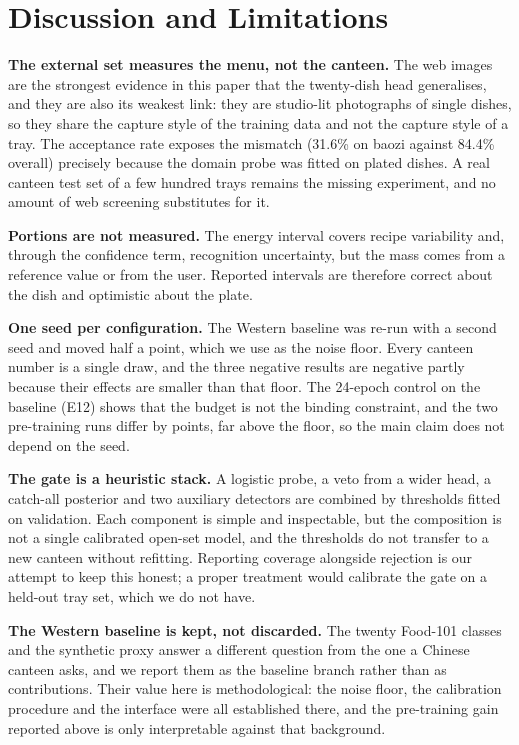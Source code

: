 \documentclass[conference]{IEEEtran}
\begin{document}
\section{Discussion and Limitations}
\label{sec:lim}
\textbf{The external set measures the menu, not the canteen.} The \webN{} web
images are the strongest evidence in this paper that the twenty-dish head
generalises, and they are also its weakest link: they are studio-lit photographs
of single dishes, so they share the capture style of the training data and not the
capture style of a tray. The acceptance rate exposes the mismatch (31.6\% on
baozi against 84.4\% overall) precisely because the domain probe was fitted on
plated dishes. A real canteen test set of a few hundred trays remains the
missing experiment, and no amount of web screening substitutes for it.

\textbf{Portions are not measured.} The energy interval covers recipe variability
and, through the confidence term, recognition uncertainty, but the mass comes from
a reference value or from the user. Reported intervals are therefore correct
about the dish and optimistic about the plate.

\textbf{One seed per configuration.} The Western baseline was re-run with a second
seed and moved half a point, which we use as the noise floor. Every canteen
number is a single draw, and the three negative results are negative partly
because their effects are smaller than that floor. The 24-epoch control on the
baseline (E12) shows that the budget is not the binding constraint, and the two
pre-training runs differ by \cnGainPretrain{} points, far above the floor, so the
main claim does not depend on the seed.

\textbf{The gate is a heuristic stack.} A logistic probe, a veto from a wider
head, a catch-all posterior and two auxiliary detectors are combined by
thresholds fitted on validation. Each component is simple and inspectable, but
the composition is not a single calibrated open-set model, and the thresholds do
not transfer to a new canteen without refitting. Reporting coverage alongside
rejection is our attempt to keep this honest; a proper treatment would calibrate
the gate on a held-out tray set, which we do not have.

\textbf{The Western baseline is kept, not discarded.} The twenty Food-101 classes
and the synthetic proxy answer a different question from the one a Chinese
canteen asks, and we report them as the baseline branch rather than as
contributions. Their value here is methodological: the noise floor, the
calibration procedure and the interface were all established there, and the
pre-training gain reported above is only interpretable against that background.
\end{document}
